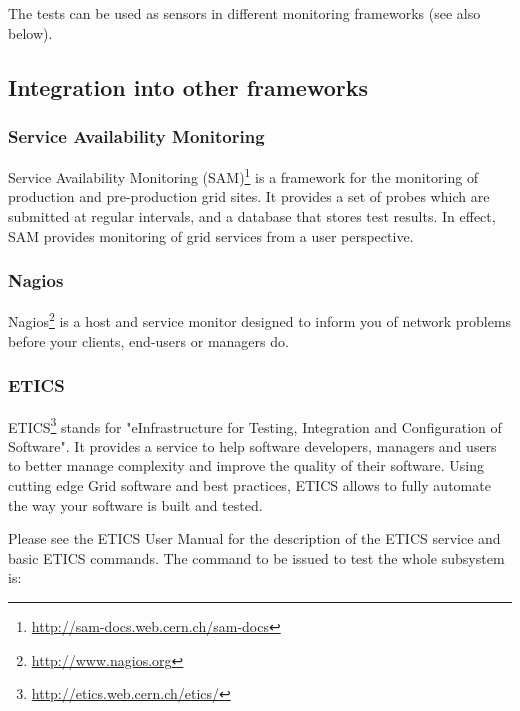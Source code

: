 The tests can be used as sensors in different monitoring frameworks 
(see also below).




\subsection{Integration into other frameworks}

\subsubsection{Service Availability Monitoring}

Service Availability Monitoring
(SAM)\footnote{\url{http://sam-docs.web.cern.ch/sam-docs}} is a framework for
the monitoring of production and pre-production grid sites. It provides a set
of probes which are submitted at regular intervals, and a database that stores
test results. In effect, SAM provides monitoring of grid services from a user
perspective. 



\subsubsection{Nagios} 

Nagios\footnote{\url{http://www.nagios.org}} is a host and service monitor
designed to inform you of network problems before your clients, end-users or
managers do.



\subsubsection{ETICS}

ETICS\footnote{\url{http://etics.web.cern.ch/etics/}} stands for
"eInfrastructure for Testing, Integration and Configuration of Software". It
provides a service to help software developers, managers and users to better
manage complexity and improve the quality of their software. Using cutting
edge Grid software and best practices, ETICS allows to fully automate
the way your software is built and tested.

Please see the ETICS User Manual \cite{etics_manual} for the description
of the ETICS service and basic ETICS commands. The command to be issued to 
test the whole \LB subsystem is:

